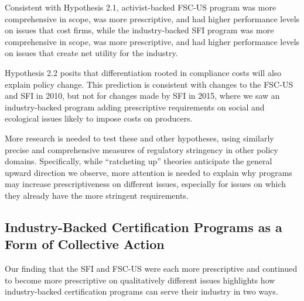\documentclass[
      12pt,
            Review ]{article}
\begin{document}
Consistent with Hypothesis 2.1, activist-backed FSC-US program was more comprehensive in scope, was more prescriptive, and had higher performance levels on issues that cost firms, while the industry-backed SFI program was more comprehensive in scope, was more prescriptive, and had higher performance levels on issues that create net utility for the industry.

Hypothesis 2.2 posits that differentiation rooted in compliance costs will also explain policy change. This prediction is consistent with changes to the FSC-US and SFI in 2010, but not for changes made by SFI in 2015, where we saw an industry-backed program adding prescriptive requirements on social and ecological issues likely to impose costs on producers.

More research is needed to test these and other hypotheses, using similarly precise and comprehensive measures of regulatory stringency in other policy domains. Specifically, while ``ratcheting up'' theories anticipate the general upward direction we observe, more attention is needed to explain why programs may increase prescriptiveness on different issues, especially for issues on which they already have the more stringent requirements.

\hypertarget{industry-backed-certification-programs-as-a-form-of-collective-action}{%
\subsection{Industry-Backed Certification Programs as a Form of Collective Action}\label{industry-backed-certification-programs-as-a-form-of-collective-action}}

Our finding that the SFI and FSC-US were each more prescriptive and continued to become more prescriptive on qualitatively different issues highlights how industry-backed certification programs can serve their industry in two ways.
\end{document}
